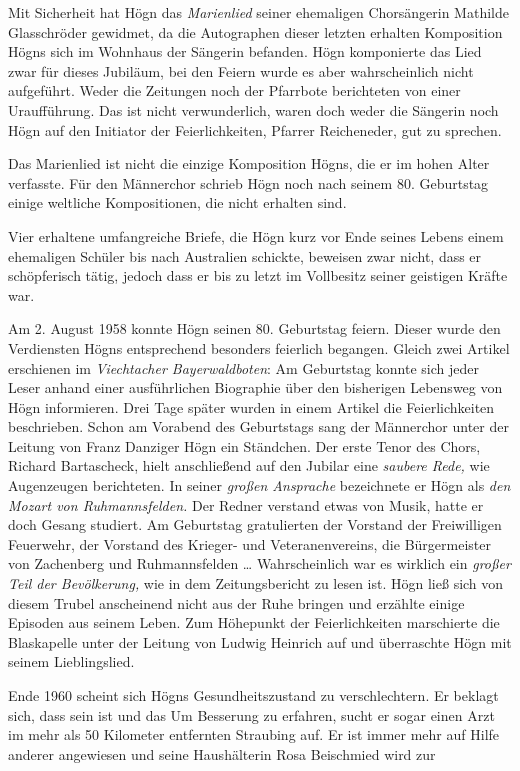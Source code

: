 Mit Sicherheit hat Högn das \textit{Marienlied} seiner ehemaligen
Chorsängerin Mathilde Glasschröder gewidmet, da die Autographen dieser
letzten erhalten Komposition Högns sich im Wohnhaus der Sängerin
befanden. Högn komponierte das Lied zwar für dieses Jubiläum, bei den
Feiern wurde es aber wahrscheinlich nicht aufgeführt. Weder die
Zeitungen noch der Pfarrbote berichteten von einer Uraufführung. Das
ist nicht verwunderlich, waren doch weder die Sängerin noch Högn auf
den Initiator der Feierlichkeiten, Pfarrer Reicheneder, gut zu
sprechen.

Das Marienlied ist nicht die einzige Komposition Högns, die er im hohen
Alter verfasste. Für den Männerchor schrieb Högn noch nach seinem 80.
Geburtstag einige weltliche Kompositionen, die nicht erhalten sind.

Vier erhaltene umfangreiche Briefe, die Högn kurz vor Ende seines
Lebens einem ehemaligen Schüler bis nach Australien schickte,
beweisen zwar nicht, dass er schöpferisch tätig, jedoch dass er bis zu
letzt im Vollbesitz seiner geistigen Kräfte war.

Am 2. August 1958 konnte Högn seinen 80. Geburtstag feiern. Dieser wurde
den Verdiensten Högns entsprechend besonders feierlich begangen. Gleich
zwei Artikel erschienen im \textit{Viechtacher Bayerwaldboten}: Am
Geburtstag konnte sich jeder Leser anhand einer ausführlichen
Biographie über den bisherigen Lebensweg von Högn informieren. Drei
Tage später wurden in einem Artikel die Feierlichkeiten beschrieben.
Schon am Vorabend des Geburtstags sang der Männerchor unter der Leitung
von Franz Danziger Högn ein Ständchen. Der erste Tenor des Chors,
Richard Bartascheck, hielt anschließend auf den Jubilar eine
\textit{saubere Rede,} wie Augenzeugen berichteten. In seiner
\textit{großen Ansprache} bezeichnete er Högn als \textit{den Mozart
von Ruhmannsfelden.} Der Redner verstand etwas von Musik, hatte er doch
Gesang studiert. Am Geburtstag gratulierten der Vorstand der
Freiwilligen Feuerwehr, der Vorstand des Krieger- und
Veteranenvereins, die Bürgermeister von Zachenberg und Ruhmannsfelden
… Wahrscheinlich war es wirklich ein \textit{großer Teil der
Bevölkerung,} wie in dem Zeitungsbericht zu lesen ist. Högn ließ sich
von diesem Trubel anscheinend nicht aus der Ruhe bringen und erzählte
einige Episoden aus seinem Leben. Zum Höhepunkt der Feierlichkeiten
marschierte die Blaskapelle unter der Leitung von Ludwig Heinrich auf
und überraschte Högn mit seinem Lieblingslied.

Ende 1960 scheint sich Högns Gesundheitszustand zu verschlechtern. Er
beklagt sich, dass sein  ist und das  Um Besserung zu erfahren, sucht er sogar einen Arzt im
mehr als 50 Kilometer entfernten Straubing auf. Er ist immer mehr auf
Hilfe anderer angewiesen und seine Haushälterin Rosa Beischmied wird
zur 

